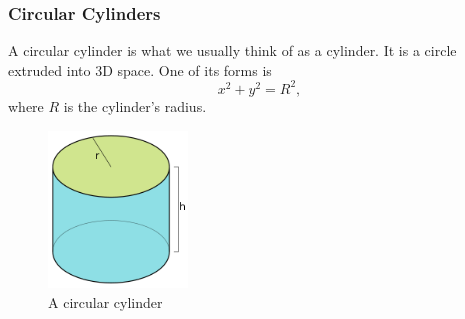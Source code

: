 \subsubsection{Circular Cylinders}
\noindent
A circular cylinder is what we usually think of as a cylinder.
It is a circle extruded into 3D space.
One of its forms is 
\begin{equation*}
	x^2 + y^2 = R^2,
\end{equation*}
where $R$ is the cylinder's radius.

\begin{figure}[H]
	\centering
	\includegraphics[width=0.33\textwidth]{./Images/differentialMultivariableCalculus/cylinder.png}
	\caption{A circular cylinder}
\end{figure}